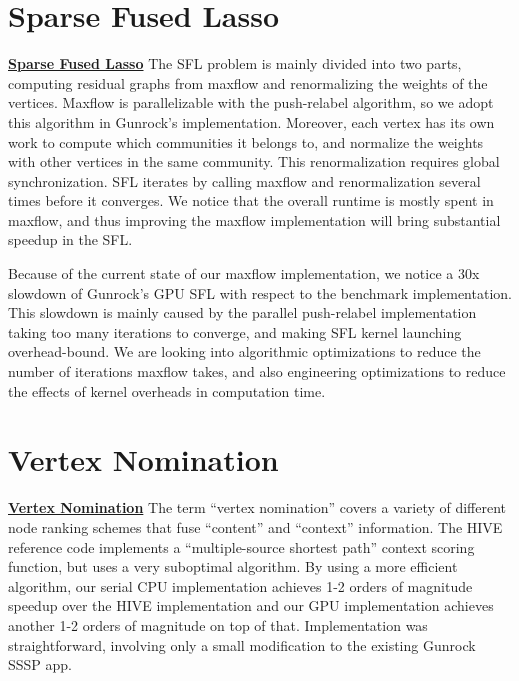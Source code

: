 \documentclass[10pt,oneside]{memoir}
\begin{document}
\hypertarget{sparse-fused-lasso}{%
\section{Sparse Fused Lasso}\label{sparse-fused-lasso}}

\textbf{\href{https://gunrock.github.io/docs/hive_sparse_graph_trend_filtering.html}{Sparse
Fused Lasso}} The SFL problem is mainly divided into two parts,
computing residual graphs from maxflow and renormalizing the weights of
the vertices. Maxflow is parallelizable with the push-relabel algorithm,
so we adopt this algorithm in Gunrock's implementation. Moreover, each
vertex has its own work to compute which communities it belongs to, and
normalize the weights with other vertices in the same community. This
renormalization requires global synchronization. SFL iterates by calling
maxflow and renormalization several times before it converges. We notice
that the overall runtime is mostly spent in maxflow, and thus improving
the maxflow implementation will bring substantial speedup in the SFL.

Because of the current state of our maxflow implementation, we notice a
30x slowdown of Gunrock's GPU SFL with respect to the benchmark
implementation. This slowdown is mainly caused by the parallel
push-relabel implementation taking too many iterations to converge, and
making SFL kernel launching overhead-bound. We are looking into
algorithmic optimizations to reduce the number of iterations maxflow
takes, and also engineering optimizations to reduce the effects of
kernel overheads in computation time.

\hypertarget{vertex-nomination}{%
\section{Vertex Nomination}\label{vertex-nomination}}

\textbf{\href{https://gunrock.github.io/docs/hive_vn.html}{Vertex
Nomination}} The term ``vertex nomination'' covers a variety of
different node ranking schemes that fuse ``content'' and ``context''
information. The HIVE reference code implements a ``multiple-source
shortest path'' context scoring function, but uses a very suboptimal
algorithm. By using a more efficient algorithm, our serial CPU
implementation achieves 1-2 orders of magnitude speedup over the HIVE
implementation and our GPU implementation achieves another 1-2 orders of
magnitude on top of that. Implementation was straightforward, involving
only a small modification to the existing Gunrock SSSP app.
\end{document}
